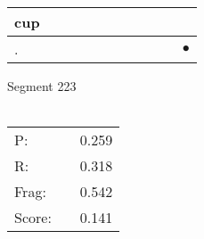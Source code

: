 \documentclass[landscape]{article}
\newcommand{\ssp}{\hspace{2pt}}
\newcommand{\mex}{\cellcolor{g}$\bullet$}
\begin{document}
\begin{tabular}{|l|p{10pt}|p{10pt}|p{10pt}|p{10pt}|p{10pt}|p{10pt}|p{10pt}|p{10pt}|p{10pt}|p{10pt}|}
\hline
\ssp cup \ssp&\hspace{2pt}&\hspace{2pt}&\hspace{2pt}&\hspace{2pt}&\hspace{2pt}&\hspace{2pt}&\hspace{2pt}&\hspace{2pt}&\hspace{2pt}&\hspace{2pt}\\
\hline
\ssp \cellcolor{ref9}. \ssp&\hspace{2pt}&\hspace{2pt}&\hspace{2pt}&\hspace{2pt}&\hspace{2pt}&\hspace{2pt}&\hspace{2pt}&\hspace{2pt}&\hspace{2pt}&\hspace{2pt}\mex\\
\hline
\end{tabular}

\vspace{6pt}
\noindent Segment 223\\\\
\noindent\begin{tabular}{lm{12pt}r}
\hline
P:&&0.259\\
R:&&0.318\\
Frag:&&0.542\\
Score:&&0.141\\
\end{tabular}

\newpage
\end{document}
